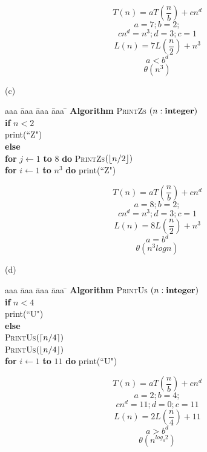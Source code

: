 \documentclass[11pt]{article}
\begin{document}
\begin{problem}
\begin{solution}
\[ T(n) = aT( \frac{n}{b} ) + cn^{d} \]
\[ a = 7; b = 2; \]
\[ cn^{d} = n^{3}; d = 3; c = 1 \]
\[ L(n) = 7L( \frac{n}{2} ) + n^{3} \]
\[ a < b^{d} \]
\[ \theta(n^{3}) \]
\end{solution}


\bigskip
\noindent
(c)\ \ 
\begin{minipage}[t]{3in}
\begin{tabbing}
aaa \= aaa \= aaa \= aaa \=  \kill
\textbf{Algorithm} \textsc{PrintZs} $(n: \mbox{\bf integer})$ \\
          \> \textbf{if} $n < 2$ \\
          \>\>  print(``Z") \\
          \>\textbf{else} \\
          \>\>  \textbf{for} $j \leftarrow 1$ \textbf{to} $8$ 
					\textbf{do} \textsc{PrintZs}$({\left\lfloor n/2\right\rfloor})$\\
      \>\> \textbf{for} $i \leftarrow 1$ \textbf{to} $n^3$ \textbf{do} print(``Z")
\end{tabbing}
\end{minipage}

\begin{solution}
\[ T(n) = aT( \frac{n}{b} ) + cn^{d} \]
\[ a = 8; b = 2; \]
\[ cn^{d} = n^{3}; d = 3; c = 1 \]
\[ L(n) = 8L( \frac{n}{2} ) + n^{3} \]
\[ a = b^{d} \]
\[ \theta(n^{3} log n ) \]
\end{solution}

\bigskip
\noindent
(d)\ \ 
\begin{minipage}[t]{3in}
\begin{tabbing}
aaa \= aaa \= aaa \= aaa \=  \kill
\textbf{Algorithm} \textsc{PrintUs} $(n: \mbox{\bf integer})$ \\
          \> \textbf{if} $n < 4$ \\
          \>\>  print(``U") \\
          \>\textbf{else} \\
          \>\>  \textsc{PrintUs}$({\left\lceil n/4\right\rceil})$\\
          \>\>  \textsc{PrintUs}$({\left\lfloor n/4\right\rfloor})$\\
      \>\> \textbf{for} $i \leftarrow 1$ \textbf{to} $11$ \textbf{do} print(``U")
\end{tabbing}
\end{minipage}

\begin{solution}
\[ T(n) = aT( \frac{n}{b} ) + cn^{d} \]
\[ a = 2; b = 4; \]
\[ cn^{d} = 11; d = 0; c = 11 \]
\[ L(n) = 2L( \frac{n}{4} ) + 11 \]
\[ a > b^{d} \]
\[ \theta(n^{log_{4}2}) \]
\end{solution}


\end{problem}
\end{document}
